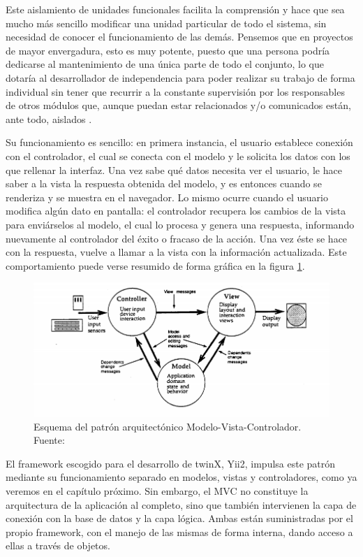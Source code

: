 Este aislamiento de unidades funcionales facilita la comprensión y hace que sea mucho más sencillo modificar una unidad particular de todo el sistema, sin necesidad de conocer el funcionamiento de las demás. Pensemos que en proyectos de mayor envergadura, esto es muy potente, puesto que una persona podría dedicarse al mantenimiento de una única parte de todo el conjunto, lo que dotaría al desarrollador de independencia para poder realizar su trabajo de forma individual sin tener que recurrir a la constante supervisión por los responsables de otros módulos que, aunque puedan estar relacionados y/o comunicados están, ante todo, aislados \cite{krasner88}.

Su funcionamiento es sencillo: en primera instancia, el usuario establece conexión con el controlador, el cual se conecta con el modelo y le solicita los datos con los que rellenar la interfaz. Una vez sabe qué datos necesita ver el usuario, le hace saber a la vista la respuesta obtenida del modelo, y es entonces cuando se renderiza y se muestra en el navegador. Lo mismo ocurre cuando el usuario modifica algún dato en pantalla: el controlador recupera los cambios de la vista para enviárselos al modelo, el cual lo procesa y genera una respuesta, informando nuevamente al controlador del éxito o fracaso de la acción. Una vez éste se hace con la respuesta, vuelve a llamar a la vista con la información actualizada. Este comportamiento puede verse resumido de forma gráfica en la figura \ref{fig:mvc}.

\begin{figure}
	\centering
	\includegraphics[width=\textwidth]{img/mvc}
	\caption[Esquema MVC]{Esquema del patrón arquitectónico Modelo-Vista-Controlador. Fuente: \cite{krasner88}}
	\label{fig:mvc}
\end{figure}


El framework escogido para el desarrollo de twinX, Yii2, impulsa este patrón mediante su funcionamiento separado en modelos, vistas y controladores, como ya veremos en el capítulo próximo. Sin embargo, el MVC no constituye la arquitectura de la aplicación al completo, sino que también intervienen la capa de conexión con la base de datos y la capa lógica. Ambas están suministradas por el propio framework, con el manejo de las mismas de forma interna, dando acceso a ellas a través de objetos.